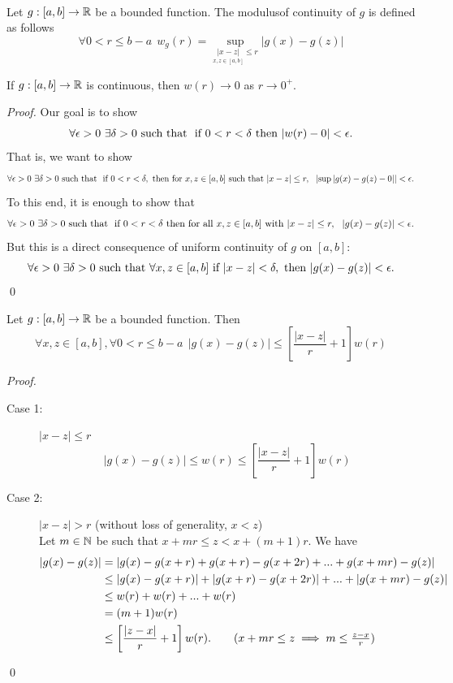 \begin{definition}  \leavevmode \\
    Let $g:[a,b] \to \mathbb{R}$ be a bounded function. The modulusof continuity of $g$ is defined as follows
    \[\forall 0 < r \leq b-a ~~w_g(r) = \underset{\underset{x,z \in [a,b]}{ |x-z|} \leq r}{\sup}|g(x)-g(z)|\]
\end{definition}

\begin{fact}
    If $g:[a,b] \to \mathbb{R}$ is continuous, then $w(r) \to 0$ as $r \to 0^+$.
\end{fact}

\begin{proof}
    Our goal is to show
    \[\forall \epsilon > 0 ~\exists \delta > 0 \text{ such that } \text{ if } 0 < r < \delta \text{ then } |w(r) - 0| <\epsilon.\]
    That is, we want to show
    \[\forall \epsilon > 0 ~\exists \delta > 0 \text{ such that } \text{ if } 0 < r < \delta, \text{ then for } x,z \in [a,b] \text{ such that } |x-z| \leq r, ~~\left|\sup |g(x) - g(z) - 0|\right| < \epsilon.\]
    To this end, it is enough to show that
    \[\forall \epsilon > 0 ~\exists \delta > 0 \text{ such that } \text{ if } 0 < r < \delta \text{ then for all }x,z \in [a,b] \text{ with } |x-z| \leq r, ~~|g(x)-g(z)| < \epsilon.\]
    But this is a direct consequence of uniform continuity of $g$ on $[a,b]$:
    \[\forall \epsilon > 0 ~\exists \delta > 0 \text{ such that } \forall x,z \in [a,b] \text{ if } |x-z| < \delta, \text{ then } |g(x) - g(z)| < \epsilon.\]
    \qed
\end{proof}

\begin{fact}
    Let $g:[a,b] \to \mathbb{R}$ be a bounded function. Then 
    \[\forall x,z \in [a,b], \forall 0 < r \leq b-a ~~ |g(x) - g(z)| \leq \left[\dfrac{|x-z|}{r}+1\right]w(r)\]
\end{fact}

\begin{proof}
    \begin{description}
        \item[Case 1: ] $|x-z| \leq r$ \\
        \[|g(x) - g(z)| \leq w(r) \leq \left[\dfrac{|x-z|}{r}+1\right]w(r)\]
        
        \item[Case 2: ] $|x - z| > r$ (without loss of generality, $x < z$) \\
        Let $m \in \mathbb{N}$ be such that $x+mr \leq z < x+ (m+1)r.$ We have 
        \begin{align*}
            |g(x)-g(z)| &=|g(x)-g(x+r) + g(x+r) - g(x+2r) + ... + g(x+mr) - g(z)| \\
            &\leq |g(x) - g(x+r)| + |g(x+r) -g(x+2r)| +... + |g(x+mr)-g(z)| \\ 
            &\leq w(r) + w(r) + ... + w(r) \\
            &= (m+1)w(r) \\ 
            &\leq \left[\dfrac{|z-x|}{r}+1\right]w(r). \tag{$x+mr \leq z \implies m \leq \frac{z-x}{r}$}
        \end{align*}
    \end{description}
    \qed
\end{proof}

